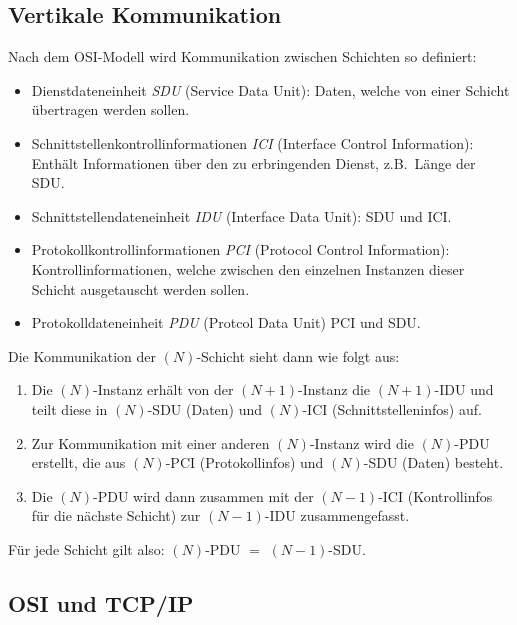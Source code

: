 \documentclass[a4paper,parskip=half*,DIV=15,fontsize=11pt]{scrartcl}
\begin{document}
\subsection{Vertikale Kommunikation}

Nach dem OSI-Modell wird Kommunikation zwischen Schichten so definiert:

\begin{itemize}
    \item Dienstdateneinheit \emph{SDU} (Service Data Unit): Daten, welche von einer Schicht übertragen werden sollen.
    \item Schnittstellenkontrollinformationen \emph{ICI} (Interface Control Information): Enthält Informationen über den zu erbringenden Dienst, z.B.\ Länge der SDU.
    \item Schnittstellendateneinheit \emph{IDU} (Interface Data Unit): SDU und ICI.
    \item Protokollkontrollinformationen \emph{PCI} (Protocol Control Information): Kontrollinformationen, welche zwischen den einzelnen Instanzen dieser Schicht ausgetauscht werden sollen.
    \item Protokolldateneinheit \emph{PDU} (Protcol Data Unit) PCI und SDU.
\end{itemize}

Die Kommunikation der $(N)$-Schicht sieht dann wie folgt aus:

\begin{enumerate}
    \item Die $(N)$-Instanz erhält von der $(N{+}1)$-Instanz die $(N{+}1)$-IDU und teilt diese in $(N)$-SDU (Daten) und $(N)$-ICI (Schnittstelleninfos) auf.
    \item Zur Kommunikation mit einer anderen $(N)$-Instanz wird die $(N)$-PDU erstellt, die aus $(N)$-PCI (Protokollinfos) und $(N)$-SDU (Daten) besteht.
    \item Die $(N)$-PDU wird dann zusammen mit der $(N{-}1)$-ICI (Kontrollinfos für die nächste Schicht) zur $(N{-}1)$-IDU zusammengefasst.
\end{enumerate}

Für jede Schicht gilt also: $(N)$-PDU $=$ $(N{-}1)$-SDU.

\subsection{OSI und TCP/IP}
\end{document}
